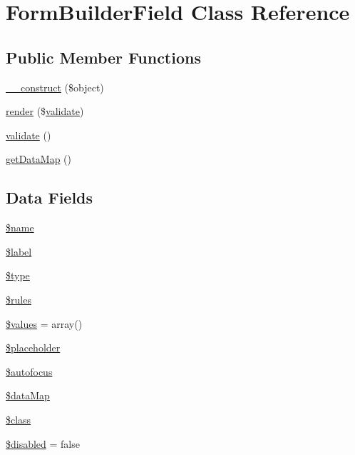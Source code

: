 \hypertarget{class_form_builder_field}{\section{Form\-Builder\-Field Class Reference}
\label{class_form_builder_field}
}
\subsection*{Public Member Functions}
\begin{DoxyCompactItemize}
\item 
\hyperlink{class_form_builder_field_a4c1397393acd678c82288e23931da583}{\-\_\-\-\_\-construct} (\$object)
\item 
\hyperlink{class_form_builder_field_aa4b074485f3cbfcc9f12c3bc806aaba4}{render} (\$\hyperlink{class_form_builder_field_a184909dab34698899937d810a9f5d393}{validate})
\item 
\hyperlink{class_form_builder_field_a184909dab34698899937d810a9f5d393}{validate} ()
\item 
\hyperlink{class_form_builder_field_a0828e6a5b4a68fc77042472bc886ae15}{get\-Data\-Map} ()
\end{DoxyCompactItemize}
\subsection*{Data Fields}
\begin{DoxyCompactItemize}
\item 
\hyperlink{class_form_builder_field_ab2fc40d43824ea3e1ce5d86dee0d763b}{\$name}
\item 
\hyperlink{class_form_builder_field_a177af2bf70bede02de3d05a425fb8e43}{\$label}
\item 
\hyperlink{class_form_builder_field_a9a4a6fba2208984cabb3afacadf33919}{\$type}
\item 
\hyperlink{class_form_builder_field_a811d22ac55b4592f7f2a202529629419}{\$rules}
\item 
\hyperlink{class_form_builder_field_affc45c6ace2eeb3f300b054dbf9592b6}{\$values} = array()
\item 
\hyperlink{class_form_builder_field_a8eaeb0b5f26eeebf5508f97b7321cc0e}{\$placeholder}
\item 
\hyperlink{class_form_builder_field_a1f7d94fdbdde79722943e438c76f6e90}{\$autofocus}
\item 
\hyperlink{class_form_builder_field_ab8eee52ae0aef5e6e6392d6f3365962c}{\$data\-Map}
\item 
\hyperlink{class_form_builder_field_a252ba022809910ea710a068fc1bab657}{\$class}
\item 
\hyperlink{class_form_builder_field_a6c108f5b26242d862f6e51869fbfd271}{\$disabled} = false
\end{DoxyCompactItemize}


